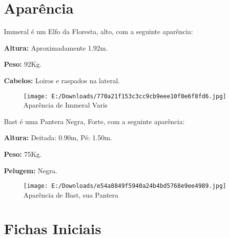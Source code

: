 \documentclass[a4paper,12p]{book}
\begin{document}
	\section{Aparência}
	\begin{multicols}{2}
		
	Immeral é um Elfo da Floresta, alto, com a seguinte aparência:
	
	\textbf{Altura:} Aproximadamente 1.92m.
	
	\textbf{Peso:} 92Kg.
	
	\textbf{Cabelos:} Loiros e raspados na lateral.
	
	\begin{figure}[H]
		\centering
		\texttt{[image: E:/Downloads/770a21f153c3cc9cb9eee10f0e6f8fd6.jpg]}
		Aparência de Immeral Varis
	\end{figure}
	
	
	
	Bast é uma Pantera Negra, Forte, com a seguinte aparência:
	
	\textbf{Altura:} Deitada: 0.90m, Pé: 1.50m.
	
	\textbf{Peso:} 75Kg.
	
	\textbf{Pelugem:} Negra.
	
	\begin{figure}[H]
		\centering
		\texttt{[image: E:/Downloads/e54a8849f5940a24b4bd5768e9ee4989.jpg]}
		Aparência de Bast, sua Pantera
	\end{figure}

	\end{multicols}
	
	
	
	
	
	
	
	
	
	
	
	\section{Fichas Iniciais}
	
\end{document}
